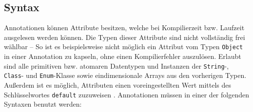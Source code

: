 \subsection{Syntax}
\label{java_annotationen_anwendung}
\noindent Annotationen können Attribute besitzen, welche bei Kompilierzeit bzw. Laufzeit ausgelesen werden können. Die Typen dieser Attribute sind nicht vollständig frei wählbar -- So ist es beispielsweise nicht möglich ein Attribut vom Typen \texttt{Object} in einer Annotation zu kapseln, ohne einen Kompilierfehler auszulösen. Erlaubt sind alle primitiven bzw. atomaren Datentypen und Instanzen der \texttt{String}-, \texttt{Class}- und \texttt{Enum}-Klasse sowie eindimensionale Arrays aus den vorherigen Typen. Außerdem ist es möglich, Attributen einen voreingestellten Wert mittels des Schlüsselwortes \texttt{default} zuzuweisen \cite{Gosling2005}. Annotationen müssen in einer der folgenden Syntaxen benutzt werden:
